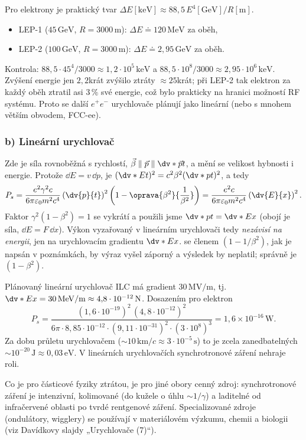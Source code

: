 \begin{priklad}[LEP]
Pro elektrony je praktický tvar
\(\Delta E[\mathrm{keV}]\approx88{,}5\,E^4[\mathrm{GeV}]/R[\mathrm{m}]\).
\begin{itemize}
  \item LEP-1 (\(45\,\mathrm{GeV}\), \(R=3000\,\mathrm{m}\)):
    \(\Delta E\doteq120\,\mathrm{MeV}\) za oběh,
  \item LEP-2 (\(100\,\mathrm{GeV}\), \(R=3000\,\mathrm{m}\)):
    \(\Delta E\doteq2{,}95\,\mathrm{GeV}\) za oběh.
\end{itemize}
Kontrola: \(88{,}5\cdot45^4/3000\approx1{,}2\cdot10^5\,\mathrm{keV}\) a
\(88{,}5\cdot10^8/3000\approx2{,}95\cdot10^6\,\mathrm{keV}\). Zvýšení
energie jen \(2{,}2\)krát zvýšilo ztráty \(\approx25\)krát; při LEP-2 tak
elektron za každý oběh ztratil asi \(3\,\%\) své energie, což bylo
prakticky na hranici možností RF systému. Proto se další \(e^+e^-\)
urychlovače plánují jako lineární (nebo s mnohem větším obvodem, FCC-ee).
\end{priklad}

\subsubsection*{b) Lineární urychlovač}
Zde je síla rovnoběžná s rychlostí, \(\vec\beta\parallel\vec p\parallel
\dv*{\vec p}{t}\), a mění se velikost hybnosti i energie. Protože
\(\dd E=v\,\dd p\), je \((\dv*{E}{t})^2=c^2\beta^2(\dv*{p}{t})^2\), a tedy
\[
  P_s=\frac{e^2\gamma^2c}{6\pi\varepsilon_0m^2c^4}\left(\dv{p}{t}\right)^2
  \left(1-\oprava{\beta^2}{\frac{1}{\beta^2}}\right)
  =\frac{e^2c}{6\pi\varepsilon_0m^2c^4}\left(\dv{E}{x}\right)^2 .
\]
Faktor \(\gamma^2(1-\beta^2)=1\) se vykrátí a použili jsme
\(\dv*{p}{t}=\dv*{E}{x}\) (obojí je síla, \(\dd E=F\,\dd x\)). Výkon
vyzařovaný v lineárním urychlovači tedy \emph{nezávisí na energii}, jen na
urychlovacím gradientu \(\dv*{E}{x}\).
 se členem \((1-1/\beta^2)\), jak je napsán v poznámkách, by
výraz vyšel záporný a výsledek by neplatil; správně je \((1-\beta^2)\).

\begin{priklad}[ILC]
Plánovaný lineární urychlovač ILC má gradient \(30\,\mathrm{MV/m}\),
tj.\ \(\dv*{E}{x}=30\,\mathrm{MeV/m}\approx4{,}8\cdot10^{-12}\,\mathrm{N}\).
Dosazením pro elektron
\[
  P_s=\frac{(1{,}6\cdot10^{-19})^2\,(4{,}8\cdot10^{-12})^2}
  {6\pi\cdot8{,}85\cdot10^{-12}\cdot(9{,}11\cdot10^{-31})^2\cdot(3\cdot10^{8})^3}
  =1{,}6\times10^{-16}\,\mathrm{W}.
\]
Za dobu průletu urychlovačem (\(\sim10\,\mathrm{km}/c\approx
3\cdot10^{-5}\,\mathrm{s}\)) to je zcela zanedbatelných
\(\sim10^{-20}\,\mathrm{J}\approx0{,}03\,\mathrm{eV}\). V lineárních
urychlovačích synchrotronové záření nehraje roli.
\end{priklad}

\begin{vysvetleni}
Co je pro částicové fyziky ztrátou, je pro jiné obory cenný zdroj:
synchrotronové záření je intenzivní, kolimované (do kužele o úhlu
\(\sim1/\gamma\)) a laditelné od infračervené oblasti po tvrdé rentgenové
záření. Specializované zdroje (ondulátory, wigglery) se používají
v materiálovém výzkumu, chemii a biologii (viz Davídkovy slajdy
„Urychlovače (7)“).
\end{vysvetleni}
